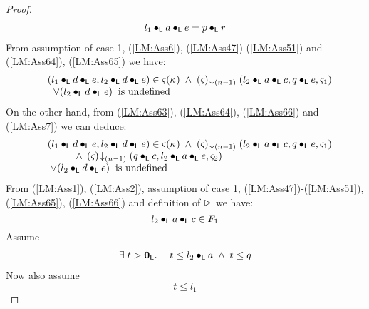 \begin{lemma}[]
\begin{proof}
\begin{align}
	l_1 \bullet_{\textsf{L}} a \bullet_{\textsf{L}} e = p \bullet_{\textsf{L}} r \label{LM:Ass65}
\end{align}
%
From assumption of case 1, (\ref{LM:Ass6}), (\ref{LM:Ass47})-(\ref{LM:Ass51}) and (\ref{LM:Ass64}), (\ref{LM:Ass65}) we have:
%
\begin{align}
	\begin{array}{l l}
	& (l_1 \bullet_{\textsf{L}} d \bullet_{\textsf{L}} e, l_2 \bullet_{\textsf{L}} d \bullet_{\textsf{L}} e) \in \varsigma_{}(\kappa_{}) \;\land\; \left(\varsigma_{}\right) \!\downarrow_{(n-1)} \left(l_2 \bullet_{\textsf{L}} a \bullet_{\textsf{L}} c, q \bullet_{\textsf{L}} e, \varsigma_{1}\right)\\
	& \;\;\lor (l_2 \bullet_{\textsf{L}} d \bullet_{\textsf{L}} e)\hspace*{0.2cm}\text{is undefined}
	\end{array} \label{LM:Ass66}
\end{align}
%
On the other hand, from (\ref{LM:Ass63}), (\ref{LM:Ass64}), (\ref{LM:Ass66}) and (\ref{LM:Ass7}) we can deduce:
%
\begin{align}
	\begin{array}{l l}
		&(l_1 \bullet_{\textsf{L}} d \bullet_{\textsf{L}} e, l_2 \bullet_{\textsf{L}} d \bullet_{\textsf{L}} e) \in \varsigma_{}(\kappa_{}) \;\land\;
		\left(\varsigma_{}\right) \!\downarrow_{(n-1)} \left(l_2 \bullet_{\textsf{L}} a \bullet_{\textsf{L}} c, q \bullet_{\textsf{L}} e, \varsigma_{1}\right)\\
		& \hspace*{1cm}\land\; \left(\varsigma_{}\right) \!\downarrow_{(n-1)} \left(q \bullet_{\textsf{L}} c, l_2 \bullet_{\textsf{L}} a \bullet_{\textsf{L}} e, \varsigma_{2}\right)\\
		& \;\lor (l_2 \bullet_{\textsf{L}} d \bullet_{\textsf{L}} e)\hspace*{0.2cm}\text{is undefined}
	\end{array} \label{LM:Ass67}
\end{align}
From (\ref{LM:Ass1}), (\ref{LM:Ass2}), assumption of case 1, (\ref{LM:Ass47})-(\ref{LM:Ass51}), (\ref{LM:Ass65}), (\ref{LM:Ass66})  and definition of $\rhd$ we have:
%
\begin{equation}
	l_2 \bullet_{\textsf{L}} a \bullet_{\textsf{L}} c \in F_1 \label{LM:Ass68}
\end{equation}
%
Assume 
%
\begin{align}
	\begin{array}{l l}
		\exists\; t > \mathbf{0}_{\textsf{L}}.\; & t \leq l_2 \bullet_{\textsf{L}} a \;\land\; t \leq q
	\end{array} \label{LM:Con1}
\end{align}
%
Now also assume 
\begin{equation}
	t \leq l_1 \label{LM:Con2}
\end{equation}

\end{proof}
\end{lemma}
